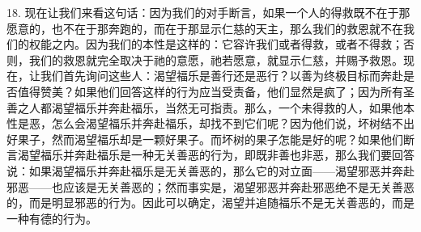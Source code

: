 18. 现在让我们来看这句话：因为我们的对手断言，如果一个人的得救既不在于那愿意的，也不在于那奔跑的，而在于那显示仁慈的天主，那么我们的救恩就不在我们的权能之内。因为我们的本性是这样的：它容许我们或者得救，或者不得救；否则，我们的救恩就完全取决于祂的意愿，祂若愿意，就显示仁慈，并赐予救恩。现在，让我们首先询问这些人：渴望福乐是善行还是恶行？以善为终极目标而奔赴是否值得赞美？如果他们回答这样的行为应当受责备，他们显然是疯了；因为所有圣善之人都渴望福乐并奔赴福乐，当然无可指责。那么，一个未得救的人，如果他本性是恶，怎么会渴望福乐并奔赴福乐，却找不到它们呢？因为他们说，坏树结不出好果子，然而渴望福乐却是一颗好果子。而坏树的果子怎能是好的呢？如果他们断言渴望福乐并奔赴福乐是一种无关善恶的行为，即既非善也非恶，那么我们要回答说：如果渴望福乐并奔赴福乐是无关善恶的，那么它的对立面——渴望邪恶并奔赴邪恶——也应该是无关善恶的；然而事实是，渴望邪恶并奔赴邪恶绝不是无关善恶的，而是明显邪恶的行为。因此可以确定，渴望并追随福乐不是无关善恶的，而是一种有德的行为。\par

